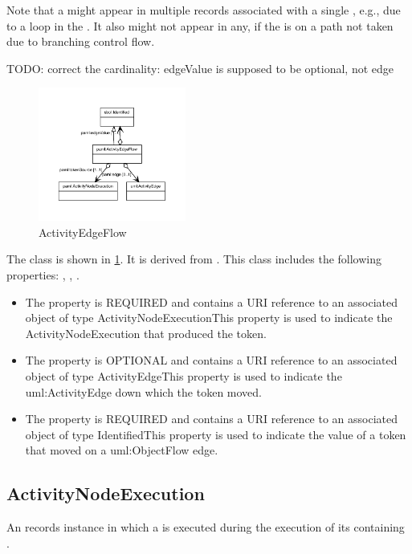         Note that a  might appear in multiple  records associated with a single
        , e.g., due to a loop in the .  It also might not appear in any, if the
         is on a path not taken due to branching control flow.

        TODO: correct the cardinality: edgeValue is supposed to be optional, not edge
\newline%
\linebreak%


\begin{figure}[h!]%
\centering%
\includegraphics[width=0.4319148936170213\textwidth]{paml_classes/ActivityEdgeFlow_abstraction_hierarchy.pdf}%
\caption{ActivityEdgeFlow}%
\label{fig:ActivityEdgeFlow}%
\end{figure}

%
The  class is shown in \ref{fig:ActivityEdgeFlow}. It is derived from .%
This class includes the following properties: , , . %
\begin{itemize}%
\item%
The  property is REQUIRED and contains a URI reference to an associated object of type ActivityNodeExecutionThis property is used to indicate the ActivityNodeExecution that produced the token.%
\item%
The  property is OPTIONAL and contains a URI reference to an associated object of type ActivityEdgeThis property is used to indicate the uml:ActivityEdge down which the token moved.%
\item%
The  property is REQUIRED and contains a URI reference to an associated object of type IdentifiedThis property is used to indicate the value of a token that moved on a uml:ObjectFlow edge.%
\end{itemize}%
\subsection{ActivityNodeExecution}%
\label{sec:paml:ActivityNodeExecution}%
An  records  instance in which a  is executed during the
        execution of its containing .

